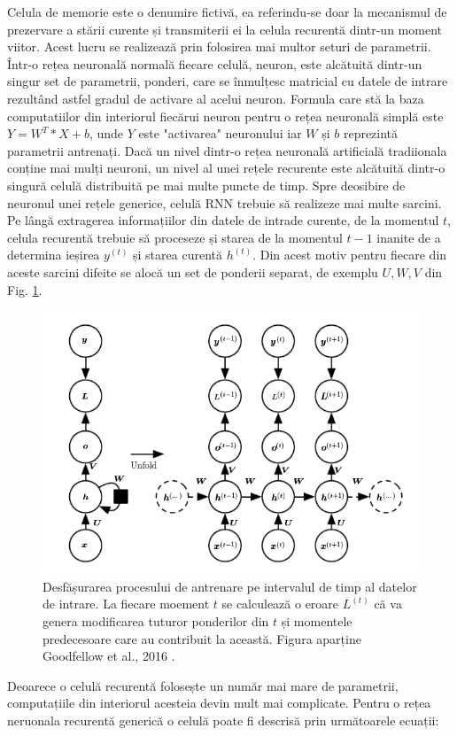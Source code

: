 \documentclass[a4paper,12pt]{book}
\begin{document}
				Celula de memorie este o denumire fictivă, ea referindu-se doar la mecanismul de prezervare a stării curente și transmiterii ei la celula recurentă dintr-un moment viitor. Acest lucru se realizează prin folosirea mai multor seturi de parametrii. Într-o rețea neuronală normală fiecare celulă, neuron, este alcătuită dintr-un singur set de parametrii, ponderi, care se înmulțesc matricial cu datele de intrare rezultând astfel gradul de activare al acelui neuron. Formula care stă la baza computatiilor din interiorul fiecărui neuron pentru o rețea neuronală simplă  este $Y = W^T * X + b$, unde $Y$ este "activarea" neuronului iar $W$ și $b$  reprezintă parametrii antrenați. Dacă un nivel dintr-o rețea neuronală artificială tradiionala conține mai mulți neuroni, un nivel al unei rețele recurente este alcătuită dintr-o singură celulă distribuită pe mai multe puncte de timp. Spre deosibire de neuronul unei rețele generice, celulă RNN trebuie să realizeze mai multe sarcini. Pe lângă extragerea informațiilor din datele de intrade curente, de la momentul $t$, celula recurentă trebuie să proceseze și starea de la momentul $t-1$ inanite de a determina ieșirea $y^{(t)}$ și starea curentă $h^{(t)}$. Din acest motiv pentru fiecare din aceste sarcini difeite se alocă un set de ponderii separat, de exemplu $U, W, V$ din Fig. \ref{fig:rnn_layer}.
				
				\begin{figure}[h]
					\centering
					\includegraphics[scale=0.6]{rnn_layer}
					\caption{Desfășurarea procesului de antrenare pe intervalul de timp al datelor de intrare. La fiecare moement $t$ se calculează o eroare $L^{(t)}$ că va genera modificarea tuturor ponderilor din $t$ și momentele predecesoare care au contribuit la această. Figura aparține Goodfellow et al., 2016 \cite{dpb}.}
					\label{fig:rnn_layer}
				\end{figure} 
					Deoarece o celulă recurentă folosește un număr mai mare de parametrii, computațiile din interiorul acesteia devin mult mai complicate. Pentru o rețea neruonala recurentă generică o celulă poate fi descrisă prin următoarele ecuații:
				
\end{document}
